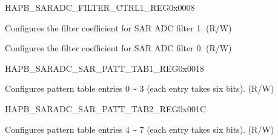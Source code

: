 \begin{register}{H}{APB\_SARADC\_FILTER\_CTRL1\_REG}{0x0008}\label{regdesc:APBSARADCFILTERCTRL1REG}
%
%
%
\regnewline%
\begin{regdesc}\begin{reglist}
\label{fielddesc:APBSARADCFILTERFACTOR1}\item [APB\_SARADC\_FILTER\_FACTOR1] Configures the filter coefficient for SAR ADC filter 1. (R/W)
\label{fielddesc:APBSARADCFILTERFACTOR0}\item [APB\_SARADC\_FILTER\_FACTOR0] Configures the filter coefficient for SAR ADC filter 0. (R/W)
\end{reglist}\end{regdesc}
\end{register}


\begin{register}{H}{APB\_SARADC\_SAR\_PATT\_TAB1\_REG}{0x0018}\label{regdesc:APBSARADCSARPATTTAB1REG}
%
%
\regnewline%
\begin{regdesc}\begin{reglist}
\label{fielddesc:APBSARADCSARPATTTAB1}\item [APB\_SARADC\_SAR\_PATT\_TAB1] Configures pattern table entries 0 \verb+~+ 3 (each entry takes six bits). (R/W)
\end{reglist}\end{regdesc}
\end{register}


\begin{register}{H}{APB\_SARADC\_SAR\_PATT\_TAB2\_REG}{0x001C}\label{regdesc:APBSARADCSARPATTTAB2REG}
%
%
\regnewline%
\begin{regdesc}\begin{reglist}
\label{fielddesc:APBSARADCSARPATTTAB2}\item [APB\_SARADC\_SAR\_PATT\_TAB2] Configures pattern table entries 4 \verb+~+ 7 (each entry takes six bits). (R/W)
\end{reglist}\end{regdesc}
\end{register}


